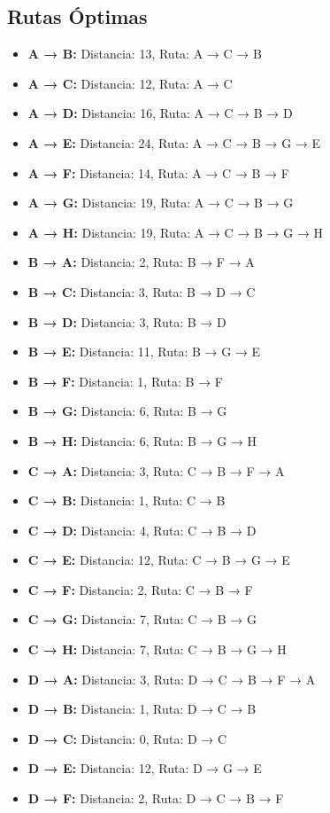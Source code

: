 \documentclass[12pt]{article}
\begin{document}
\clearpage
\subsection{Rutas Óptimas}
\begin{itemize}
\item \textbf{A → B:} Distancia: 13, Ruta: A → C → B
\item \textbf{A → C:} Distancia: 12, Ruta: A → C
\item \textbf{A → D:} Distancia: 16, Ruta: A → C → B → D
\item \textbf{A → E:} Distancia: 24, Ruta: A → C → B → G → E
\item \textbf{A → F:} Distancia: 14, Ruta: A → C → B → F
\item \textbf{A → G:} Distancia: 19, Ruta: A → C → B → G
\item \textbf{A → H:} Distancia: 19, Ruta: A → C → B → G → H
\item \textbf{B → A:} Distancia: 2, Ruta: B → F → A
\item \textbf{B → C:} Distancia: 3, Ruta: B → D → C
\item \textbf{B → D:} Distancia: 3, Ruta: B → D
\item \textbf{B → E:} Distancia: 11, Ruta: B → G → E
\item \textbf{B → F:} Distancia: 1, Ruta: B → F
\item \textbf{B → G:} Distancia: 6, Ruta: B → G
\item \textbf{B → H:} Distancia: 6, Ruta: B → G → H
\item \textbf{C → A:} Distancia: 3, Ruta: C → B → F → A
\item \textbf{C → B:} Distancia: 1, Ruta: C → B
\item \textbf{C → D:} Distancia: 4, Ruta: C → B → D
\item \textbf{C → E:} Distancia: 12, Ruta: C → B → G → E
\item \textbf{C → F:} Distancia: 2, Ruta: C → B → F
\item \textbf{C → G:} Distancia: 7, Ruta: C → B → G
\item \textbf{C → H:} Distancia: 7, Ruta: C → B → G → H
\item \textbf{D → A:} Distancia: 3, Ruta: D → C → B → F → A
\item \textbf{D → B:} Distancia: 1, Ruta: D → C → B
\item \textbf{D → C:} Distancia: 0, Ruta: D → C
\item \textbf{D → E:} Distancia: 12, Ruta: D → G → E
\item \textbf{D → F:} Distancia: 2, Ruta: D → C → B → F

\end{itemize}
\end{document}
